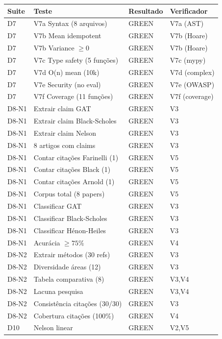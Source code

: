 \documentclass[12pt,a4paper,oneside]{article}
\begin{document}
\begin{longtable}{p{}p{}p{}p{}}
\toprule
\textbf{Suite} & \textbf{Teste} & \textbf{Resultado} & \textbf{Verificador} \\
\midrule
D7 & V7a Syntax (8 arquivos) & GREEN & V7a (AST) \\
D7 & V7b Mean idempotent & GREEN & V7b (Hoare) \\
D7 & V7b Variance $\geq 0$ & GREEN & V7b (Hoare) \\
D7 & V7c Type safety (5 funções) & GREEN & V7c (mypy) \\
D7 & V7d O(n) mean (10k) & GREEN & V7d (complex) \\
D7 & V7e Security (no eval) & GREEN & V7e (OWASP) \\
D7 & V7f Coverage (11 funções) & GREEN & V7f (coverage) \\
\midrule
D8-N1 & Extrair claim GAT & GREEN & V3 \\
D8-N1 & Extrair claim Black-Scholes & GREEN & V3 \\
D8-N1 & Extrair claim Nelson & GREEN & V3 \\
D8-N1 & 8 artigos com claims & GREEN & V3 \\
D8-N1 & Contar citações Farinelli (1) & GREEN & V5 \\
D8-N1 & Contar citações Black (1) & GREEN & V5 \\
D8-N1 & Contar citações Arnold (1) & GREEN & V5 \\
D8-N1 & Corpus total (8 papers) & GREEN & V5 \\
D8-N1 & Classificar GAT & GREEN & V3 \\
D8-N1 & Classificar Black-Scholes & GREEN & V3 \\
D8-N1 & Classificar Hénon-Heiles & GREEN & V3 \\
D8-N1 & Acurácia $\geq 75\%$ & GREEN & V4 \\
\midrule
D8-N2 & Extrair métodos (30 refs) & GREEN & V3 \\
D8-N2 & Diversidade áreas (12) & GREEN & V3 \\
D8-N2 & Tabela comparativa (8) & GREEN & V3,V4 \\
D8-N2 & Lacuna pesquisa & GREEN & V3,V4 \\
D8-N2 & Consistência citações (30/30) & GREEN & V3 \\
D8-N2 & Cobertura citações (100\%) & GREEN & V4 \\
\midrule
D10 & Nelson linear & GREEN & V2,V5 \\

\end{longtable}
\end{document}

